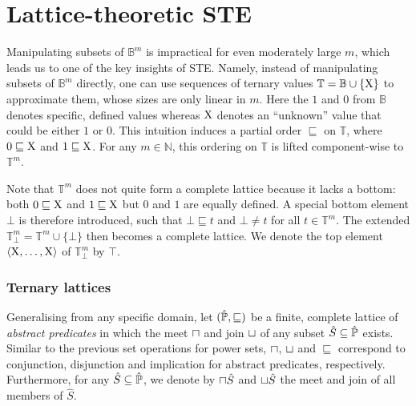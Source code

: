 \section{Lattice-theoretic STE} \label{sec:lat-ste}

Manipulating subsets of $\mathbb{B}^{m}$ is impractical for even moderately large $m$, which leads us to one of the key insights of STE. Namely, instead of manipulating subsets of $\mathbb{B}^{m}$ directly, one can use sequences of ternary values $\mathbb{T} = \mathbb{B} \cup \{ \mathrm{X} \} $ to approximate them, whose sizes are only linear in $m$. Here the $1$ and $0$ from $\mathbb{B}$ denotes specific, defined values whereas $\mathrm{X}$ denotes an ``unknown'' value that could be either $1$ or $0$. This intuition induces a partial order $\sqsubseteq$ on $\mathbb{T}$, where $0 \sqsubseteq \mathrm{X}$ and $1 \sqsubseteq \mathrm{X}$\footnotemark. For any $m \in \mathbb{N}$, this ordering on $\mathbb{T}$ is lifted component-wise to $\mathbb{T}^{m}$.



Note that $\mathbb{T}^{m}$ does not quite form a complete lattice because it lacks a bottom: both $0 \sqsubseteq \mathrm{X}$ and $1 \sqsubseteq \mathrm{X}$ but $0$ and $1$ are equally defined. A special bottom element $\bot$ is therefore introduced, such that $\bot \sqsubseteq t$ and $\bot \neq t$ for all $t \in \mathbb{T}^{m}$. The extended $\mathbb{T}_{\bot}^{m} = \mathbb{T}^{m} \cup \{ \bot \}$ then becomes a complete lattice. We denote the top element $\langle \mathrm{X}, \dots, \mathrm{X} \rangle$ of $\mathbb{T}_{\bot}^{m}$ by $\top$.

\subsubsection{Ternary lattices} \label{sec:lat-ste-intro}

Generalising from any specific domain, let $(\hat{\mathbb{P}}, \sqsubseteq)$ be a finite, complete lattice of \textit{abstract predicates} in which the meet $\sqcap$ and join $\sqcup$ of any subset $\hat S \subseteq \hat{\mathbb{P}}$ exists. Similar to the previous set operations for power sets, $\sqcap$, $\sqcup$ and $\sqsubseteq$ correspond to conjunction, disjunction and implication for abstract predicates, respectively. Furthermore, for any $\hat S \subseteq \hat{\mathbb{P}}$, we denote by $\sqcap \hat S$ and $\sqcup \hat S$ the meet and join of all members of $\hat S$.

